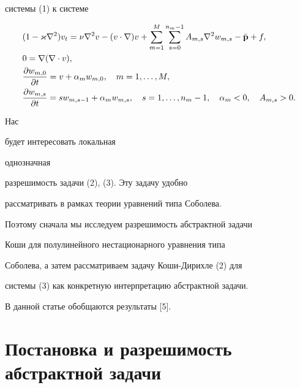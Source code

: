 системы (1) к системе


\begin{equation}


\begin{split}


& (1-\varkappa\nabla^2)v_t=\nu\nabla^2 v-(v\cdot\nabla)v


+\sum^M_{m=1}\sum^{n_m-1}_{s=0}A_{m,s}\nabla^2w_{m,s}-


\Bar{\bold p}+f,\\


& 0=\nabla(\nabla\cdot v),\\


& \frac{\partial w_{m,0}}{\partial t}=v+\alpha_mw_{m,0},


\quad m=1,\dotsc,M,\\


&\frac{\partial w_{m,s}}{\partial t}=sw_{m,s-1}+\alpha_mw_{m,s},


\quad s=1,\dotsc,n_m-1,\quad \alpha_m<0,\quad A_{m,s}>0.


\end{split}


\end{equation}





Нас


будет интересовать локальная


однозначная


разрешимость задачи (2), (3). Эту задачу удобно


рассматривать в рамках теории уравнений типа Соболева.


Поэтому сначала мы исследуем разрешимость абстрактной задачи


Коши для полулинейного нестационарного уравнения типа


Соболева, а затем рассматриваем задачу Коши-Дирихле (2) для


системы (3) как конкретную интерпретацию абстрактной задачи.





В данной статье обобщаются результаты [5].





\section{Постановка и разрешимость абстрактной задачи}





